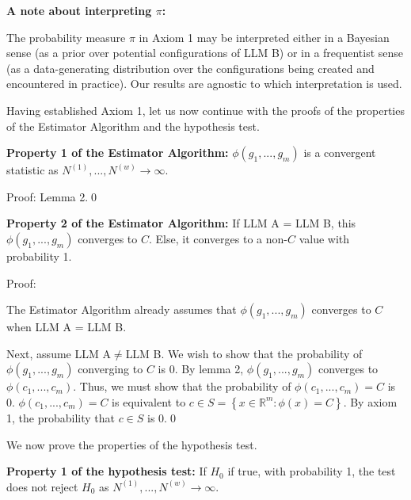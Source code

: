\documentclass{article}
\begin{document}
\textbf{A note about interpreting $\displaystyle \pi$:}

The probability measure $\displaystyle \pi $ in Axiom 1 may be interpreted either in a Bayesian sense (as a prior over potential configurations of LLM B) or in a frequentist sense (as a data-generating distribution over the configurations being created and encountered in practice). Our results are agnostic to which interpretation is used.



Having established Axiom 1, let us now continue with the proofs of the properties of the Estimator Algorithm and the hypothesis test.



\textbf{Property 1 of the Estimator Algorithm: }$\displaystyle \phi \left( g_{1} ,...,g_{m}\right)$ is a convergent statistic as $\displaystyle N^{\left( 1\right)} ,...,N^{\left( w\right)}\rightarrow \infty $.

Proof: Lemma 2.\qed 



\textbf{Property 2 of the Estimator Algorithm: }If LLM A = LLM B, this $\displaystyle \phi \left( g_{1} ,...,g_{m}\right)$ converges to $\displaystyle C$. Else, it converges to a non-$\displaystyle C$ value with probability 1.

Proof:

The Estimator Algorithm already assumes that $\displaystyle \phi \left( g_{1} ,...,g_{m}\right)$ converges to $\displaystyle C$ when LLM A = LLM B.



Next, assume LLM A$\displaystyle \neq $LLM B. We wish to show that the probability of $\displaystyle \phi \left( g_{1} ,...,g_{m}\right)$ converging to $\displaystyle C$ is 0. By lemma 2, $\displaystyle \phi \left( g_{1} ,...,g_{m}\right)$ converges to $\displaystyle \phi \left( c_{1} ,...,c_{m}\right)$. Thus, we must show that the probability of $\displaystyle \phi \left( c_{1} ,...,c_{m}\right) =C$ is 0. $\displaystyle \phi \left( c_{1} ,...,c_{m}\right) =C$ is equivalent to $\displaystyle c\in S=\left\{x\in \mathbb{R}^{m} :\phi \left( x\right) =C\right\}$. By axiom 1, the probability that $\displaystyle c\in S$ is 0.\qed 



We now prove the properties of the hypothesis test.



\textbf{Property 1 of the hypothesis test:} If $\displaystyle H_{0}$ if true, with probability 1, the test does not reject $\displaystyle H_{0}$ as $\displaystyle N^{\left( 1\right)} ,...,N^{\left( w\right)}\rightarrow \infty $.
\end{document}
